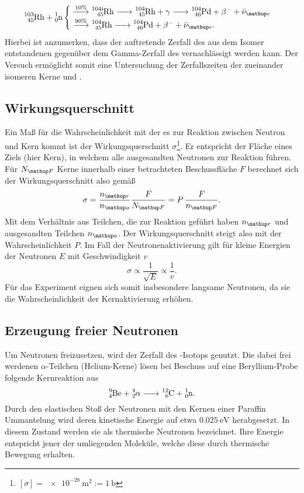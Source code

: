 \begin{equation}
\ce{^103_45 Rh + ^1_0 n} \begin{cases}
\overset{10\%}{\ce{->}} \ce{^{104i}_45 Rh -> ^{104}_45 Rh} + \gamma \ce{-> ^104_46 Pd} +  \beta^- + \bar{\nu}\ua{e}\\
\overset{90\%}{\ce{->}} \ce{^{104}_45 Rh ->  ^104_46 Pd} +  \beta^- + \bar{\nu}\ua{e}.
\end{cases}
\end{equation}
Hierbei ist anzumerken, dass der auftretende Zerfall des aus dem  Isomer entstandenen  gegenüber dem
Gamma-Zerfall des  vernachlässigt werden kann. Der Versuch ermöglicht somit eine Untersuchung der Zerfallszeiten
der zueinander isomeren Kerne  und .

\subsection{Wirkungsquerschnitt}
Ein Maß für die Wahrscheinlichkeit mit der es zur Reaktion zwischen Neutron und Kern kommt ist der Wirkungsquerschnitt
$\sigma$\footnote{$[\sigma] = \SI{e-28}{\meter^2} := \SI{1}{\barn}$}. Er entspricht
der Fläche eines Ziels (hier Kern), in welchem alle ausgesandten Neutronen zur Reaktion führen. Für $N\ua{F}$ Kerne innerhalb einer betrachteten Beschussfläche
$F$ berechnet sich der Wirkungsquerschnitt also gemäß
\begin{equation}
  \sigma = \frac{n\ua{r}}{n\ua{a}}\frac{F}{N\ua{F}} = P \,\frac{F}{n\ua{F}}.
\end{equation}
Mit dem Verhältnis aus Teilchen, die zur Reaktion geführt haben $n\ua{r}$ und ausgesandten Teilchen $n\ua{a}$. Der Wirkungsquerschnitt steigt also
mit der Wahrscheinlichkeit $P$. Im Fall der Neutronenaktivierung gilt für kleine Energien der Neutronen $E$ mit Geschwindigkeit $v$
\begin{equation}
  \sigma \propto \frac{1}{\sqrt{E}} \propto \frac{1}{v}.
\end{equation}
Für das Experiment eignen sich somit insbesondere langsame Neutronen, da sie die Wahrscheinlichkeit der Kernaktivierung erhöhen.

\subsection{Erzeugung freier Neutronen}
Um Neutronen freizusetzen, wird der Zerfall des -Isotops genutzt.
Die dabei frei werdenen $\alpha$-Teilchen (Helium-Kerne) lösen bei Beschuss auf eine Beryllium-Probe
folgende Kernreaktion aus
\begin{equation}
  \ce{^9_4 Be + ^4_2}\alpha \ce{-> ^12_6C + ^1_0 n}.
\end{equation}
Durch den elastischen Stoß der Neutronen mit den Kernen einer Paraffin Ummantelung wird deren kinetische Energie
auf etwa $\SI{0.025}{\eV}$ herabgesetzt. In diesem Zustand werden sie als thermische Neutronen bezeichnet. Ihre
Energie entspricht jener der umliegenden Moleküle, welche diese durch thermische Bewegung erhalten.

